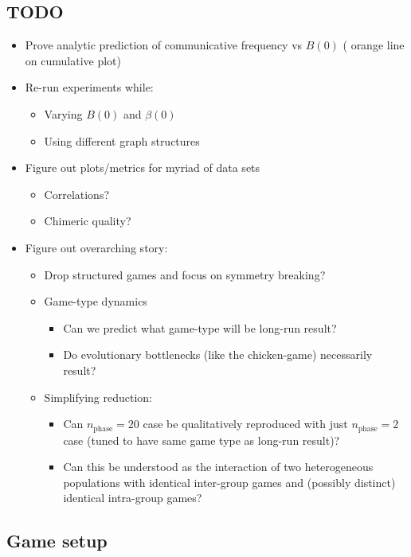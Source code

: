 \documentclass[pdflatex,lineno,referee,sn-mathphys-ay]{class/sn-jnl}
\begin{document}
\subsection{TODO}
\begin{itemize}
  \item Prove analytic prediction of communicative frequency vs $B(0)$
    (\ie{} orange line on cumulative plot)
  \item Re-run experiments while:
  \begin{itemize}
    \item Varying $B(0)$ and $\beta(0)$
    \item Using different graph structures
  \end{itemize}
  \item Figure out plots/metrics for myriad of data sets
  \begin{itemize}
    \item Correlations?
    \item Chimeric quality?
  \end{itemize}
  \item Figure out overarching story:
  \begin{itemize}
    \item Drop structured games and focus on symmetry breaking?
    \item Game-type dynamics
    \begin{itemize}
      \item Can we predict what game-type will be long-run result?
      \item Do evolutionary bottlenecks (like the chicken-game)
        necessarily result?
    \end{itemize}
    \item Simplifying reduction:
    \begin{itemize}
      \item Can $n_{\text{phase}} = 20$ case be qualitatively reproduced
        with just $n_{\text{phase}} = 2$ case (tuned to have same game
        type as long-run result)?
      \item Can this be understood as the interaction of two heterogeneous
        populations with identical inter-group games and (possibly
        distinct) identical intra-group games?
    \end{itemize}
  \end{itemize}
\end{itemize}
\subsection{Game setup}
\end{document}
